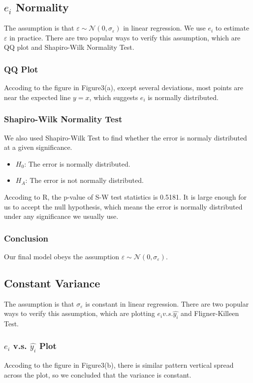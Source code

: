 \documentclass[a4paper,11pt,onecolumn,twoside]{article}
\begin{document}
\subsection{$e_i$ Normality}
The assumption is that $\varepsilon\sim \mathcal N(0,\sigma_{\varepsilon})$ in linear regression. We use $e_i$ to estimate $\varepsilon$ in practice. There are two popular ways to verify this assumption, which are QQ plot and Shapiro-Wilk Normality Test.
\subsubsection{QQ Plot}
Accoding to the figure in Figure3(a), except several deviations, most points are near the expected line $y=x$, which suggests $e_i$ is normally distributed.
\subsubsection{Shapiro-Wilk Normality Test}
We also used Shapiro-Wilk Test to find whether the error is normaly distributed at a given significance.
\begin{itemize}
	\item $H_0$: The error is normally distributed.
	\item $H_A$: The error is not normally distributed.
\end{itemize}
Accoding to R, the p-value of S-W test statistics is 0.5181. It is large enough for us to accept the null hypothesis, which
means the error is normally distributed under any significance we usually use.
\subsubsection{Conclusion}
Our final model obeys the assumption $\varepsilon\sim \mathcal N(0,\sigma_{\varepsilon})$.  
\subsection{Constant Variance}
The assumption is that $\sigma_{\varepsilon}$ is constant in linear regression. There are two popular ways to verify this assumption, which are plotting $e_i v.s. \hat{y_i}$ and Fligner-Killeen  Test.
\subsubsection{$e_i$ v.s. $\hat{y_i}$ Plot}
Accoding to the figure in Figure3(b), there is similar pattern vertical spread across the plot, so we concluded that the variance is constant.
\end{document}
